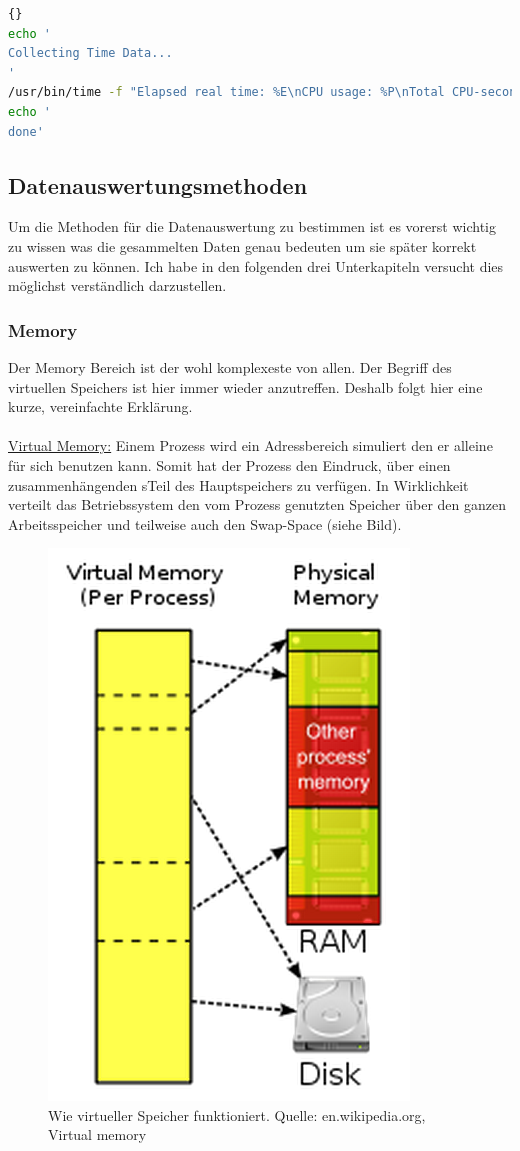 \documentclass{fancydocument}
\begin{document}
\begin{minipage}{\textwidth}
\begin{lstlisting}[language=bash,caption=Zeitdaten sammeln]{}
echo '
Collecting Time Data...
'
/usr/bin/time -f "Elapsed real time: %E\nCPU usage: %P\nTotal CPU-seconds in user mode: %U\nTotal CPU-seconds in kernel mode: %S\nName and arguments of the command: %C" -o /opt/data/$lang.time -a java -server $param -jar $code
echo '
done'
\end{lstlisting}
\end{minipage}

\subsection{Datenauswertungsmethoden}

Um die Methoden für die Datenauswertung zu bestimmen ist es vorerst wichtig zu wissen was die gesammelten Daten genau bedeuten um sie später korrekt auswerten zu können. Ich habe in den folgenden drei Unterkapiteln versucht dies möglichst verständlich darzustellen.

\subsubsection{Memory}
Der Memory Bereich ist der wohl komplexeste von allen. Der Begriff des virtuellen Speichers ist hier immer wieder anzutreffen. Deshalb folgt hier eine kurze, vereinfachte Erklärung.
\\\\
\underline{Virtual Memory:} Einem Prozess wird ein Adressbereich simuliert den er alleine für sich benutzen kann. Somit hat der Prozess den Eindruck, über einen zusammenhängenden sTeil des Hauptspeichers zu verfügen. In Wirklichkeit verteilt das Betriebssystem den vom Prozess genutzten Speicher über den ganzen Arbeitsspeicher und teilweise auch den Swap-Space (siehe Bild).
\begin{figure}[h!]
\begin{center}
\includegraphics[width=0.3\linewidth]{bilder/virtualmemory.png}
\caption{Wie virtueller Speicher funktioniert. Quelle: en.wikipedia.org, Virtual memory}
\end{center}
\end{figure}
\end{document}
